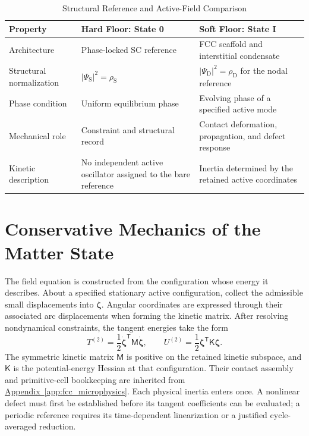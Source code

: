 \begin{table}[htbp]
\centering
\caption{Structural Reference and Active-Field Comparison}
\label{tab:wavefunction_comparison}
\renewcommand{\arraystretch}{1.25}
\small
\begin{tabular}{@{}>{\raggedright\arraybackslash}p{}>{\raggedright\arraybackslash}p{}>{\raggedright\arraybackslash}p{}@{}}
\toprule
\textbf{Property} & \textbf{Hard Floor: State 0} & \textbf{Soft Floor: State I} \\
\midrule
Architecture & Phase-locked SC reference & FCC scaffold and interstitial condensate \\
Structural normalization & $|\Psi_{\mathrm S}|^2=\rho_{\mathrm S}$ & $|\Psi_{\mathrm D}|^2=\rho_{\mathrm D}$ for the nodal reference \\
Phase condition & Uniform equilibrium phase & Evolving phase of a specified active mode \\
Mechanical role & Constraint and structural record & Contact deformation, propagation, and defect response \\
Kinetic description & No independent active oscillator assigned to the bare reference & Inertia determined by the retained active coordinates \\
\bottomrule
\end{tabular}
\end{table}

\section{Conservative Mechanics of the Matter State}

The field equation is constructed from the configuration whose energy it describes. About a specified stationary active configuration, collect the admissible small displacements into $\boldsymbol\zeta$. Angular coordinates are expressed through their associated arc displacements when forming the kinetic matrix. After resolving nondynamical constraints, the tangent energies take the form
\begin{equation}
    T^{(2)}=\frac12\dot{\boldsymbol\zeta}^{\mathsf T}
    \mathsf M\dot{\boldsymbol\zeta},
    \qquad
    U^{(2)}=\frac12\boldsymbol\zeta^{\mathsf T}
    \mathsf K\boldsymbol\zeta.
    \label{eq:X_tangent_energy}
\end{equation}
The symmetric kinetic matrix $\mathsf M$ is positive on the retained kinetic subspace, and $\mathsf K$ is the potential-energy Hessian at that configuration. Their contact assembly and primitive-cell bookkeeping are inherited from \hyperref[app:fcc_microphysics]{Appendix~\ref*{app:fcc_microphysics}}. Each physical inertia enters once. A nonlinear defect must first be established before its tangent coefficients can be evaluated; a periodic reference requires its time-dependent linearization or a justified cycle-averaged reduction.

